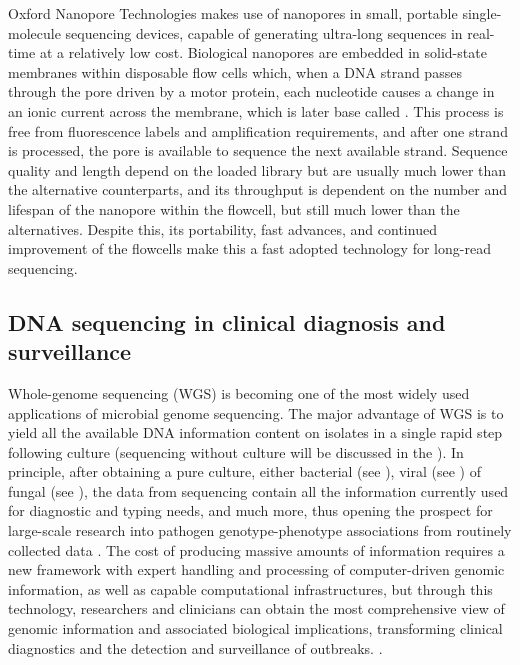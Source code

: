 Oxford Nanopore Technologies makes use of nanopores in small, portable single-molecule sequencing devices, capable of generating ultra-long sequences in real-time at a relatively low cost. Biological nanopores are embedded in solid-state membranes within disposable flow cells which, when a DNA strand passes through the pore driven by a motor protein, each nucleotide causes a change in an ionic current across the membrane, which is later base called \citep{hoang_long-reads-based_2022, loman_twenty_2015}. This process is free from fluorescence labels and amplification requirements, and after one strand is processed, the pore is available to sequence the next available strand. Sequence quality and length depend on the loaded library but are usually much lower than the alternative counterparts, and its throughput is dependent on the number and lifespan of the nanopore within the flowcell, but still much lower than the alternatives. Despite this, its portability, fast advances, and continued improvement of the flowcells make this a fast adopted technology for long-read sequencing.  

\subsection{DNA sequencing in clinical diagnosis and surveillance} \label{ssec:sequencing_diagnosis}

Whole-genome sequencing (WGS) is becoming one of the most widely used applications of microbial genome sequencing. The major advantage of WGS is to yield all the available DNA information content on isolates in a single rapid step following culture (sequencing without culture will be discussed in the ). In principle, after obtaining a pure culture, either bacterial (see ), viral (see ) of fungal (see ), the data from sequencing contain all the information currently used for diagnostic and typing needs, and much more, thus opening the prospect for large-scale research into pathogen genotype-phenotype associations from routinely collected data \citep{didelot_transforming_2012}.
The cost of producing massive amounts of information requires a new framework with expert handling and processing of computer-driven genomic information, as well as capable computational infrastructures, but through this technology, researchers and clinicians can obtain the most comprehensive view of genomic information and associated biological implications, transforming clinical diagnostics and the detection and surveillance of outbreaks. \citep{cirulli_uncovering_2010, noauthor_genomic_2019, goodwin_coming_2016}.

